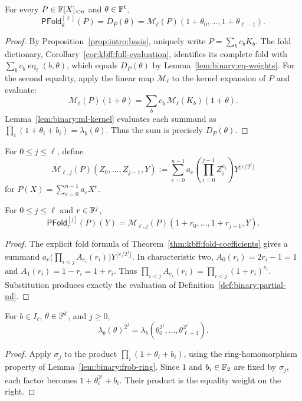 \begin{theorem}\label{thm:binary:fold-ml}
For every $P\in\mathbb{F}[X]_{<n}$ and $\theta\in\mathbb{F}^\ell$,
\[
 \boxed{
 \mathsf{PFold}^{[\ell]}_\theta(P)
  =D_P(\theta)
  =\mathscr M_\ell(P)(1+\theta_0,\ldots,1+\theta_{\ell-1}).
 }
\]
\end{theorem}
\begin{proof}
By Proposition~\ref{prop:intro:basis}, uniquely write
$P=\sum_bc_bK_b$. The fold dictionary,
Corollary~\ref{cor:kbff:full-evaluation},
identifies its complete fold with
$\sum_bc_b\operatorname{eq}_\ell(b,\theta)$,
which equals $D_P(\theta)$ by Lemma~\ref{lem:binary:eq-weights}.
For the second equality, apply the linear map $\mathscr M_\ell$
to the kernel expansion of $P$ and evaluate:
\[
 \mathscr M_\ell(P)(1+\theta)
 =\sum_bc_b\,\mathscr M_\ell(K_b)(1+\theta).
\]
Lemma~\ref{lem:binary:ml-kernel} evaluates each summand as
$\prod_i(1+\theta_i+b_i)=\lambda_b(\theta)$.
Thus the sum is precisely $D_P(\theta)$.
\end{proof}

\begin{definition}\label{def:binary:partial-ml}
For $0\leq j\leq\ell$, define
\[
 \mathscr M_{\ell,j}(P)(Z_0,\ldots,Z_{j-1},Y)
 :=\sum_{e=0}^{n-1}a_e
   \left(\prod_{i=0}^{j-1}Z_i^{e_i}\right)
   Y^{\lfloor e/2^j\rfloor}
\]
for $P(X)=\sum_{e=0}^{n-1}a_eX^e$.
\end{definition}

\begin{lemma}\label{lem:binary:partial-fold}
For $0\leq j\leq\ell$ and $r\in\mathbb{F}^j$,
\[
 \boxed{
 \mathsf{PFold}^{[j]}_r(P)(Y)
 =\mathscr M_{\ell,j}(P)(1+r_0,\ldots,1+r_{j-1},Y).
 }
\]
\end{lemma}
\begin{proof}
The explicit fold formula of
Theorem~\ref{thm:kbff:fold-coefficients}
gives a summand
$a_e\bigl(\prod_{i<j}A_{e_i}(r_i)\bigr)Y^{\lfloor e/2^j\rfloor}$.
In characteristic two, $A_0(r_i)=2r_i-1=1$ and
$A_1(r_i)=1-r_i=1+r_i$.
Thus $\prod_{i<j}A_{e_i}(r_i)=\prod_{i<j}(1+r_i)^{e_i}$.
Substitution produces exactly the evaluation of
Definition~\ref{def:binary:partial-ml}.
\end{proof}

\begin{lemma}\label{lem:binary:lambda-frob}
For $b\in I_\ell$, $\theta\in\mathbb{F}^\ell$, and $j\geq0$,
\[
 \lambda_b(\theta)^{2^j}
 =\lambda_b(\theta_0^{2^j},\ldots,\theta_{\ell-1}^{2^j}).
\]
\end{lemma}
\begin{proof}
Apply $\sigma_j$ to the product
$\prod_i(1+\theta_i+b_i)$, using the ring-homomorphism
property of Lemma~\ref{lem:binary:frob-ring}.
Since $1$ and $b_i\in\mathbb{F}_2$ are fixed by $\sigma_j$,
each factor becomes $1+\theta_i^{2^j}+b_i$.
Their product is the equality weight on the right.
\end{proof}

